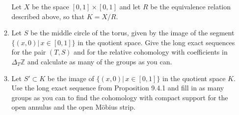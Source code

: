 \documentclass{article}
\newcommand{\zed}{\mathbb Z}
\begin{document}
\begin{enumerate}
\begin{enumerate}
Let $X$ be the space $[0,1]\times [0,1]$ and let $R$ be the equivalence relation described above, so that $K = X/R$.  


\item
Let $S$ be the middle circle of the torus, given by the image of the segment $\{(x,0)|\,x\in[0,1]\}$ in the quotient space. Give the long exact sequences for the pair $(T,S)$ 
and for the relative cohomology with coefficients in $\Delta_T\zed$ and calculate as many of the groups as you can.
\item
Let $S'\subset K$ be the image of $\{(x,0)|\,x\in[0,1]\}$ in the quotient space $K$.
Use the long exact sequence from Proposition 9.4.1 and fill in as many groups as you can to find the cohomology with compact support for 
the open annulus and the open M\"obius strip.
\end{enumerate}


\end{enumerate}
\end{document}
